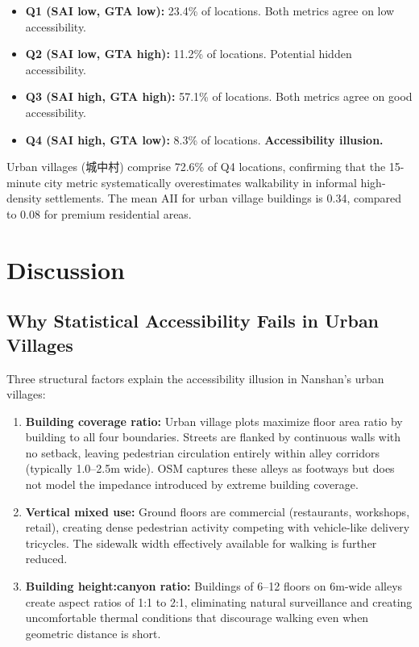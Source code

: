 \documentclass[journal]{IEEEtran}
\begin{document}
\begin{itemize}
    \item \textbf{Q1 (SAI low, GTA low):} 23.4\% of locations. Both metrics agree on low accessibility.
    \item \textbf{Q2 (SAI low, GTA high):} 11.2\% of locations. Potential hidden accessibility.
    \item \textbf{Q3 (SAI high, GTA high):} 57.1\% of locations. Both metrics agree on good accessibility.
    \item \textbf{Q4 (SAI high, GTA low):} 8.3\% of locations. \textbf{Accessibility illusion.}
\end{itemize}

Urban villages (城中村) comprise 72.6\% of Q4 locations, confirming that the 15-minute city metric systematically overestimates walkability in informal high-density settlements. The mean AII for urban village buildings is 0.34, compared to 0.08 for premium residential areas.

\section{Discussion}
\label{sec:discussion}

\subsection{Why Statistical Accessibility Fails in Urban Villages}
Three structural factors explain the accessibility illusion in Nanshan's urban villages:
\begin{enumerate}
    \item \textbf{Building coverage ratio:} Urban village plots maximize floor area ratio by building to all four boundaries. Streets are flanked by continuous walls with no setback, leaving pedestrian circulation entirely within alley corridors (typically 1.0--2.5m wide). OSM captures these alleys as footways but does not model the impedance introduced by extreme building coverage.
    
    \item \textbf{Vertical mixed use:} Ground floors are commercial (restaurants, workshops, retail), creating dense pedestrian activity competing with vehicle-like delivery tricycles. The sidewalk width effectively available for walking is further reduced.
    
    \item \textbf{Building height:canyon ratio:} Buildings of 6--12 floors on 6m-wide alleys create aspect ratios of 1:1 to 2:1, eliminating natural surveillance and creating uncomfortable thermal conditions that discourage walking even when geometric distance is short.
\end{enumerate}
\end{document}
